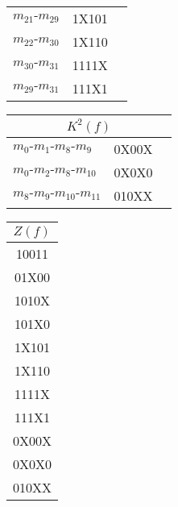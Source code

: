 \documentclass{article}
\begin{document}
\begin{center}
\begin{tabular}[t]{|lcc|}
$m_{21}\mbox{-}m_{29}$ & 1X101& \\$m_{22}\mbox{-}m_{30}$ & 1X110& \\\hline
$m_{30}\mbox{-}m_{31}$ & 1111X& \\$m_{29}\mbox{-}m_{31}$ & 111X1& \\\hline
\end{tabular}
\begin{tabular}[t]{|lcc|}
\hline \multicolumn{3}{|c|}{$K^2(f)$}\\ \hline
$m_{0}\mbox{-}m_{1}\mbox{-}m_{8}\mbox{-}m_{9}$ & 0X00X& \\$m_{0}\mbox{-}m_{2}\mbox{-}m_{8}\mbox{-}m_{10}$ & 0X0X0& \\\hline
$m_{8}\mbox{-}m_{9}\mbox{-}m_{10}\mbox{-}m_{11}$ & 010XX& \\\hline
\end{tabular}
\begin{tabular}[t]{|c|}
\hline $Z(f)$ \\ \hline
10011\\
01X00\\
1010X\\
101X0\\
1X101\\
1X110\\
1111X\\
111X1\\
0X00X\\
0X0X0\\
010XX\\
\hline \end{tabular}
\end{center}
\end{document}
